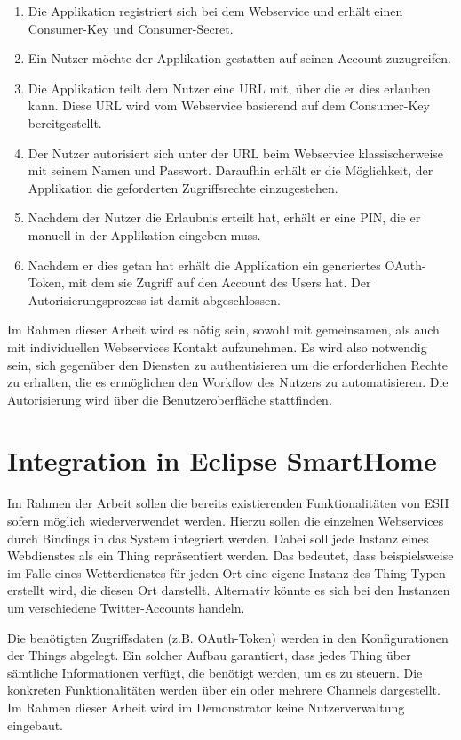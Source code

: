 \begin{enumerate}
\item Die Applikation registriert sich bei dem Webservice und erhält einen Consumer-Key und Consumer-Secret.
\item Ein Nutzer möchte der Applikation gestatten auf seinen Account zuzugreifen.
\item Die Applikation teilt dem Nutzer eine URL mit, über die er dies erlauben kann. Diese URL wird vom Webservice basierend auf dem Consumer-Key bereitgestellt. 
\item Der Nutzer autorisiert sich unter der URL beim Webservice klassischerweise mit seinem Namen und Passwort. Daraufhin erhält er die Möglichkeit, der Applikation die geforderten Zugriffsrechte einzugestehen.
\item Nachdem der Nutzer die Erlaubnis erteilt hat, erhält er eine PIN, die er manuell in der Applikation eingeben muss. 
\item Nachdem er dies getan hat erhält die Applikation ein generiertes OAuth-Token, mit dem sie Zugriff auf den Account des Users hat. Der Autorisierungsprozess ist damit abgeschlossen.
\end{enumerate}


Im Rahmen dieser Arbeit wird es nötig sein, sowohl mit gemeinsamen, als auch mit individuellen Webservices Kontakt aufzunehmen. Es wird also notwendig sein, sich gegenüber den Diensten zu authentisieren um die erforderlichen Rechte zu erhalten, die es ermöglichen den Workflow des Nutzers zu automatisieren. Die Autorisierung wird über die Benutzeroberfläche stattfinden.



\section{Integration in Eclipse SmartHome}
\label{sec:integrationESH}
Im Rahmen der Arbeit sollen die bereits existierenden Funktionalitäten von ESH sofern möglich wiederverwendet werden. Hierzu sollen die einzelnen Webservices durch Bindings in das System integriert werden. 
Dabei soll jede Instanz eines Webdienstes als ein Thing repräsentiert werden. Das bedeutet, dass beispielsweise im Falle eines Wetterdienstes für jeden Ort eine eigene Instanz des Thing-Typen erstellt wird, die diesen Ort darstellt. Alternativ könnte es sich bei den Instanzen um verschiedene Twitter-Accounts handeln.

Die benötigten Zugriffsdaten (z.B. OAuth-Token) werden in den Konfigurationen der Things abgelegt. Ein solcher Aufbau garantiert, dass jedes Thing über sämtliche Informationen verfügt, die benötigt werden, um es zu steuern. Die konkreten Funktionalitäten werden über ein oder mehrere Channels dargestellt. Im Rahmen dieser Arbeit wird im Demonstrator keine Nutzerverwaltung eingebaut.


